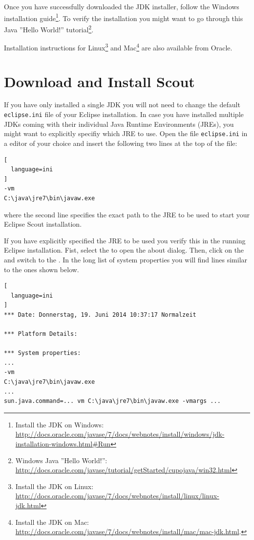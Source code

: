 \documentclass[a4paper,10pt,twoside]{book}
\begin{document}
Once you have successfully downloaded the JDK installer, follow the Windows installation guide\footnote{
Install the JDK on Windows: \url{http://docs.oracle.com/javase/7/docs/webnotes/install/windows/jdk-installation-windows.html\#Run}}.
To verify the installation you might want to go through this Java ''Hello World!'' 
tutorial\footnote{Windows Java ''Hello World!'': \url{http://docs.oracle.com/javase/tutorial/getStarted/cupojava/win32.html}}.

Installation instructions for Linux\footnote{
Install the JDK on Linux: \url{http://docs.oracle.com/javase/7/docs/webnotes/install/linux/linux-jdk.html}
}
and Mac\footnote{
Install the JDK on Mac: \url{http://docs.oracle.com/javase/7/docs/webnotes/install/mac/mac-jdk.html}.
}
are also available from Oracle.

\section{Download and Install Scout}



If you have only installed a single JDK you will not need to change the default \texttt{eclipse.ini} file of your Eclipse installation.
In case you have installed multiple JDKs coming with their individual Java Runtime Environments (JREs), you might want to explicitly specifiy which JRE to use.
Open the file \texttt{eclipse.ini} in a editor of your choice and insert the following two lines at the top of the file:

\begin{lstlisting}[
  language=ini
]
-vm
C:\java\jre7\bin\javaw.exe
\end{lstlisting}

where the second line specifies the exact path to the JRE to be used to start your Eclipse Scout installation.

If you have explicitly specified the JRE to be used you verify this in the running Eclipse installation.
Fist, select the  to open the about dialog.
Then, click on the  and switch to the .
In the long list of system properties you will find lines similar to the ones shown below.

\begin{lstlisting}[
  language=ini
]
*** Date: Donnerstag, 19. Juni 2014 10:37:17 Normalzeit

*** Platform Details:

*** System properties:
...
-vm
C:\java\jre7\bin\javaw.exe
...
sun.java.command=... vm C:\java\jre7\bin\javaw.exe -vmargs ...
\end{lstlisting}
\end{document}
